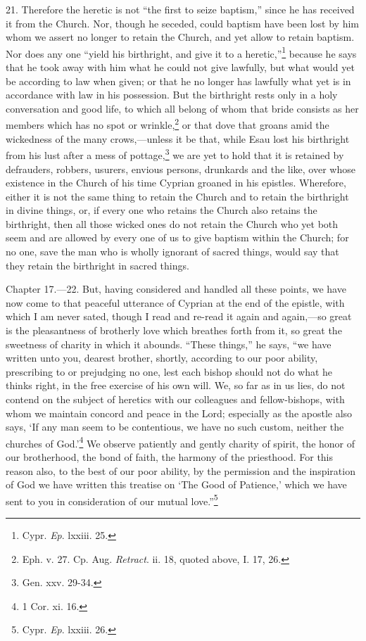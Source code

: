 21. Therefore the heretic is not ``the first to seize baptism,'' since he has received it from the Church. Nor, though he seceded, could baptism have been lost by him whom we assert no longer to retain the Church, and yet allow to retain baptism. Nor does any one ``yield his birthright, and give it to a heretic,''\footnote{\par  Cypr. \emph{Ep}. lxxiii. 25.} because he says that he took away with him what he could not give lawfully, but what would yet be according to law when given; or that he no longer has lawfully what yet is in accordance with law in his possession. But the birthright rests only in a holy conversation and good life, to which all belong of whom that bride consists as her members which has no spot or wrinkle,\footnote{\par  Eph. v. 27. Cp. Aug. \emph{ Retract}. ii. 18, quoted above, I. 17, 26.} or that dove that groans amid the wickedness of the many crows,—unless it be that, while Esau lost his birthright from his lust after a mess of pottage,\footnote{\par  Gen. xxv. 29-34.} we are yet to hold that it is retained by defrauders, robbers, usurers, envious persons, drunkards and the like, over whose existence in the Church of his time Cyprian groaned in his epistles. Wherefore, either it is not the same thing to retain the Church and to retain the birthright in divine things, or, if every one who retains the Church also retains the birthright, then all those wicked ones do not retain the Church who yet both seem and are allowed by every one of us to give baptism within the Church; for no one, save the man who is wholly ignorant of sacred things, would say that they retain the birthright in sacred things.


Chapter 17.—22. But, having considered and handled all these points, we have now come to that peaceful utterance of Cyprian at the end of the epistle, with which I am never sated, though I read and re-read it again and again,—so great is the pleasantness of brotherly love which breathes forth from it, so great the sweetness of charity in which it abounds. ``These things,'' he says, ``we have written unto you, dearest brother, shortly, according to our poor ability, prescribing to or prejudging no one, lest each bishop should not do what he thinks right, in the free exercise of his own will. We, so far as in us lies, do not contend on the subject of heretics with our colleagues and fellow-bishops, with whom we maintain concord and peace in the Lord; especially as the apostle also says, ‘If any man seem to be contentious, we have no such custom, neither the churches of God.’\footnote{\par  1 Cor. xi. 16.} We observe patiently and gently charity of spirit, the honor of our brotherhood, the bond of faith, the harmony of the priesthood. For this reason also, to the best of our poor ability, by the permission and the inspiration of God we have written this treatise on ‘The Good of Patience,’ which we have sent to you in consideration of our mutual love.''\footnote{\par  Cypr. \emph{Ep}. lxxiii. 26.}

